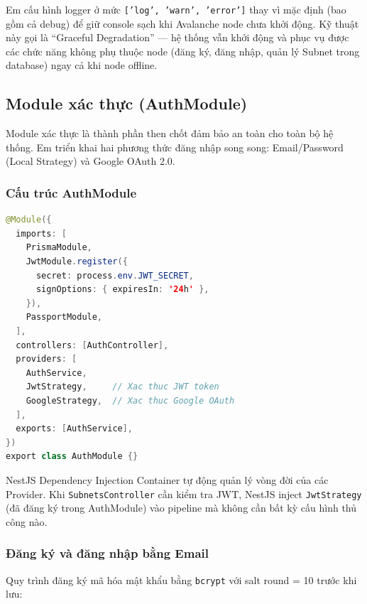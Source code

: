 Em cấu hình logger ở mức \texttt{['log', 'warn', 'error']} thay vì mặc định (bao gồm cả debug) để giữ console sạch khi Avalanche node chưa khởi động. Kỹ thuật này gọi là ``Graceful Degradation'' --- hệ thống vẫn khởi động và phục vụ được các chức năng không phụ thuộc node (đăng ký, đăng nhập, quản lý Subnet trong database) ngay cả khi node offline.

\subsection{Module xác thực (AuthModule)}

Module xác thực là thành phần then chốt đảm bảo an toàn cho toàn bộ hệ thống. Em triển khai hai phương thức đăng nhập song song: Email/Password (Local Strategy) và Google OAuth 2.0.

\subsubsection{Cấu trúc AuthModule}

\begin{lstlisting}[caption={AuthModule --- Đăng ký các thành phần xác thực}, label={lst:auth_module}, language=Java]
@Module({
  imports: [
    PrismaModule,
    JwtModule.register({
      secret: process.env.JWT_SECRET,
      signOptions: { expiresIn: '24h' },
    }),
    PassportModule,
  ],
  controllers: [AuthController],
  providers: [
    AuthService,
    JwtStrategy,     // Xac thuc JWT token
    GoogleStrategy,  // Xac thuc Google OAuth
  ],
  exports: [AuthService],
})
export class AuthModule {}
\end{lstlisting}

NestJS Dependency Injection Container tự động quản lý vòng đời của các Provider. Khi \texttt{SubnetsController} cần kiểm tra JWT, NestJS inject \texttt{JwtStrategy} (đã đăng ký trong AuthModule) vào pipeline mà không cần bất kỳ cấu hình thủ công nào.

\subsubsection{Đăng ký và đăng nhập bằng Email}

Quy trình đăng ký mã hóa mật khẩu bằng \texttt{bcrypt} với salt round = 10 trước khi lưu:

